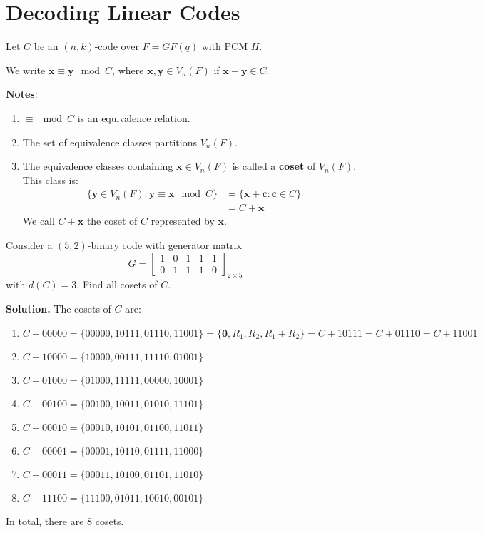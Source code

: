 \section{Decoding Linear Codes}
Let $ C $ be an $ (n,k) $-code over $ F=GF(q) $ with PCM $ H $.

\begin{defbox}
    \begin{definition}
        We write $ \bm{x}\equiv \bm{y} \mod C $, where $ \bm{x},\bm{y}\in V_n(F) $
        if $ \bm{x}-\bm{y}\in C $.
    \end{definition}
\end{defbox}

\textbf{Notes}:
\begin{enumerate}[(1)]
    \item $ \equiv\mod C $ is an equivalence relation.
    \item The set of equivalence classes partitions $ V_n(F) $.
    \item The equivalence classes containing $ \bm{x}\in V_n(F) $
    is called a \textbf{coset} of $ V_n(F) $. This class is:
    \begin{align*}
        \{\bm{y}\in V_n(F):\bm{y}\equiv \bm{x}\mod C\}
        &=\{\bm{x}+\bm{c}:\bm{c}\in C\}\\
        &=C+\bm{x}
    \end{align*}
    We call $ C+\bm{x} $ the coset of $ C $ represented by $ \bm{x} $.
\end{enumerate}

\begin{exbox}
    \begin{example}[Cosets]
        Consider a $ (5,2) $-binary code with generator matrix
        \[ G=\begin{bmatrix}
            1 & 0 & 1 & 1 & 1\\
            0 & 1 & 1 & 1 & 0
        \end{bmatrix}_{2\times 5} \]
        with $ d(C)=3 $. Find all cosets of $ C $.

        \textbf{Solution.} The cosets of $ C $ are:
        \begin{enumerate}[(1)]
            \item $ C+00000=\{00000,10111,01110,11001\}=\{\bm{0},R_1,R_2, R_1+R_2\} 
            = C+10111 = C+01110 = C + 11001 $
            \item $ C+10000=\{10000,00111,11110,01001\} $
            \item $ C+01000=\{01000,11111,00000,10001\} $
            \item $ C+00100=\{00100,10011,01010,11101\} $
            \item $ C+00010=\{00010,10101,01100,11011\} $
            \item $ C+00001=\{00001,10110,01111,11000\} $
            \item $ C+00011=\{00011,10100,01101,11010\} $
            \item $ C+11100=\{11100,01011,10010,00101\} $
        \end{enumerate}
        In total, there are $ 8 $ cosets.
    \end{example}
\end{exbox}

